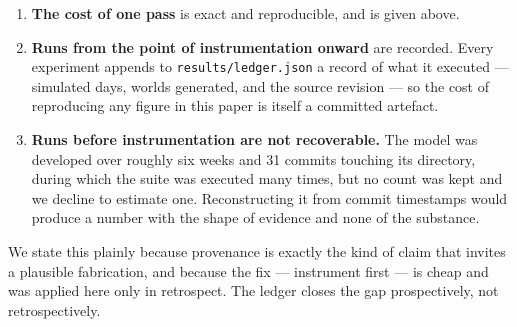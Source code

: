 \begin{enumerate}
\item \textbf{The cost of one pass} is exact and reproducible, and is given
  above.
\item \textbf{Runs from the point of instrumentation onward} are recorded.
  Every experiment appends to \texttt{results/ledger.json} a record of what it
  executed --- simulated days, worlds generated, and the source revision --- so
  the cost of reproducing any figure in this paper is itself a committed
  artefact.
\item \textbf{Runs before instrumentation are not recoverable.} The model was
  developed over roughly six weeks and 31 commits touching its directory,
  during which the suite was executed many times, but no count was kept and we
  decline to estimate one. Reconstructing it from commit timestamps would
  produce a number with the shape of evidence and none of the substance.
\end{enumerate}

We state this plainly because provenance is exactly the kind of claim that
invites a plausible fabrication, and because the fix --- instrument first --- is
cheap and was applied here only in retrospect. The ledger closes the gap
prospectively, not retrospectively.
